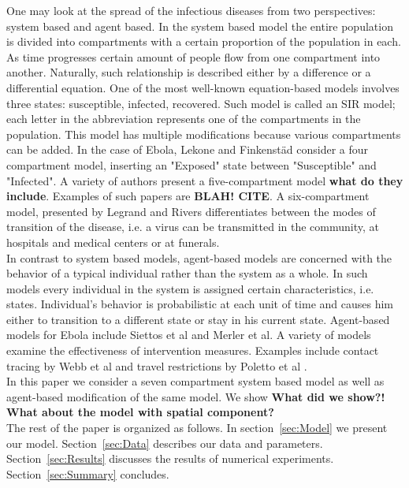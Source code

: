 \documentclass[10pt]{article}
\begin{document}
One may look at the spread of the infectious diseases from two perspectives: system based and agent based. In the system based model the entire population is divided into compartments with a certain proportion of the population in each. As time progresses certain amount of people flow from one compartment into another. Naturally, such relationship is described either by a difference or a differential equation. One of the most well-known equation-based models involves three states: susceptible, infected, recovered. Such model is called an SIR model; each letter in the abbreviation represents one of the compartments in the population. This model has multiple modifications because various compartments can be added. In the case of Ebola, Lekone and Finkenstäd \cite{Lekone2006} consider a four compartment model, inserting an "Exposed" state between "Susceptible" and "Infected". A variety of authors present a five-compartment model \textbf{what do they include}. Examples of such papers are \textbf{BLAH! CITE}. A six-compartment model, presented by Legrand \cite{Legrand2007} and Rivers\cite{Rivers2014} differentiates between the modes of transition of the disease, i.e. a virus can be transmitted in the community, at hospitals and medical centers or at funerals.\\
In contrast to system based models, agent-based models are concerned with the behavior of a typical individual rather than the system as a whole. In such models every individual in the system is assigned certain characteristics, i.e. states. Individual's behavior is probabilistic at each unit of time and causes him either to transition to a different state or stay in his current state. Agent-based models for Ebola include Siettos et al \cite{Siettos2015} and Merler et al\cite{Merler2015}. A variety of models examine the effectiveness of intervention measures. Examples include contact tracing by Webb et al \cite{Webb2015} and travel restrictions by Poletto et al \cite{Poletto2014}.\\
In this paper we consider a seven compartment system based model as well as agent-based modification of the same model. We show \textbf{What did we show?!} \textbf{What about the model with spatial component?}\\
The rest of the paper is organized as follows. In section~\ref{sec:Model} we present our model. Section~\ref{sec:Data} describes our data and parameters. Section~\ref{sec:Results} discusses the results of numerical experiments. Section~\ref{sec:Summary} concludes.\\\\
\end{document}
